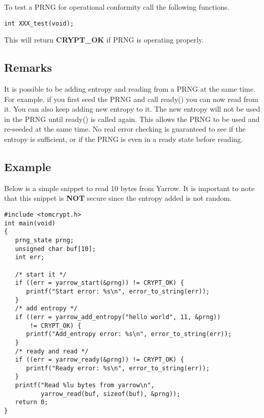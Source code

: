 \documentclass[synpaper]{book}
\begin{document}
To test a PRNG for operational conformity call the following functions.

\begin{verbatim}
int XXX_test(void);
\end{verbatim}

This will return \textbf{CRYPT\_OK} if PRNG is operating properly.

\subsection{Remarks}

It is possible to be adding entropy and reading from a PRNG at the same time.  For example, if you first seed the PRNG
and call ready() you can now read from it.  You can also keep adding new entropy to it.  The new entropy will not be used
in the PRNG until ready() is called again.  This allows the PRNG to be used and re-seeded at the same time.  No real error
checking is guaranteed to see if the entropy is sufficient, or if the PRNG is even in a ready state before reading.

\subsection{Example}
Below is a simple snippet to read 10 bytes from Yarrow.  It is important to note that this snippet is {\bf NOT} secure since
the entropy added is not random.

\begin{verbatim}
#include <tomcrypt.h>
int main(void)
{
   prng_state prng;
   unsigned char buf[10];
   int err;

   /* start it */
   if ((err = yarrow_start(&prng)) != CRYPT_OK) {
      printf("Start error: %s\n", error_to_string(err));
   }
   /* add entropy */
   if ((err = yarrow_add_entropy("hello world", 11, &prng))
       != CRYPT_OK) {
      printf("Add_entropy error: %s\n", error_to_string(err));
   }
   /* ready and read */
   if ((err = yarrow_ready(&prng)) != CRYPT_OK) {
      printf("Ready error: %s\n", error_to_string(err));
   }
   printf("Read %lu bytes from yarrow\n",
          yarrow_read(buf, sizeof(buf), &prng));
   return 0;
}
\end{verbatim}
\end{document}
